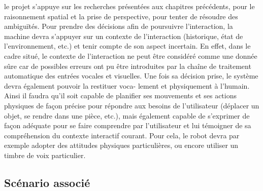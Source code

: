 \documentclass[a4paper,11pt,twoside]{StyleThese}
\begin{document}
le projet s'appuye sur les recherches présentées aux chapitres précédents, pour le  raisonnement
spatial et la prise de perspective, pour tenter de résoudre des ambiguïtés.
Pour prendre des décisions afin de poursuivre l’interaction, la machine devra s’appuyer sur un contexte de l’interaction (historique, état de l’environnement, etc.) et tenir
compte de son aspect incertain. En effet, dans le cadre situé, le contexte de l’interaction ne peut être considéré comme une donnée sûre car de possibles erreurs ont pu être
introduites par la chaîne de traitement automatique des entrées vocales et visuelles.
Une fois sa décision prise, le système devra également pouvoir la restituer voca-
lement et physiquement à l’humain. Ainsi il faudra qu’il soit capable de planifier ses
mouvements et ses actions physiques de façon précise pour répondre aux besoins de
l’utilisateur (déplacer un objet, se rendre dans une pièce, etc.), mais également capable
de s’exprimer de façon adéquate pour se faire comprendre par l’utilisateur et lui témoigner de sa compréhension du contexte interactif courant. Pour cela, le robot devra par
exemple adopter des attitudes physiques particulières, ou encore utiliser un timbre de
voix particulier.


\subsection{Scénario associé}
\end{document}
